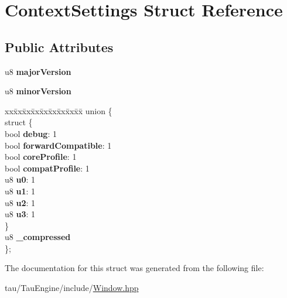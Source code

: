 \hypertarget{struct_context_settings}{}\section{Context\+Settings Struct Reference}
\label{struct_context_settings}
\subsection*{Public Attributes}
\begin{DoxyCompactItemize}
\item 
\mbox{\label{struct_context_settings_aa48f22f01f7daf081cb332b6c07f1bea}} 
u8 {\bfseries major\+Version}
\item 
\mbox{\label{struct_context_settings_a7f5296c29e6c3af528ec3a1b0aae7ff0}} 
u8 {\bfseries minor\+Version}
\item 
\mbox{\label{struct_context_settings_ab3d4f48945f4c17fa889390db75c3b30}} 
\begin{tabbing}
xx\=xx\=xx\=xx\=xx\=xx\=xx\=xx\=xx\=\kill
union \{\\
\mbox{\label{union_context_settings_1_1_0D0_a3fd40cde7009bd341cb6670f11e9ed7c}} 
\>struct \{\\
\>\>bool {\bfseries debug}: 1\\
\>\>bool {\bfseries forwardCompatible}: 1\\
\>\>bool {\bfseries coreProfile}: 1\\
\>\>bool {\bfseries compatProfile}: 1\\
\>\>u8 {\bfseries u0}: 1\\
\>\>u8 {\bfseries u1}: 1\\
\>\>u8 {\bfseries u2}: 1\\
\>\>u8 {\bfseries u3}: 1\\
\>\} \\
\>u8 {\bfseries \_compressed}\\
\}; \\

\end{tabbing}\end{DoxyCompactItemize}


The documentation for this struct was generated from the following file\+:\begin{DoxyCompactItemize}
\item 
tau/\+Tau\+Engine/include/\mbox{\hyperlink{_window_8hpp}{Window.\+hpp}}\end{DoxyCompactItemize}
